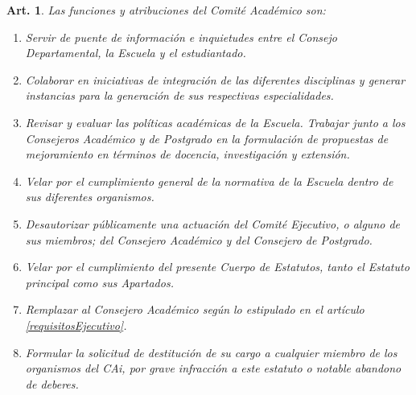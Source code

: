 \documentclass[letterpaper,11pt]{article}
\theoremstyle{plain}
\newtheorem{art}{Art.} %
\begin{document}
		\begin{art}\label{funcionesComiteAcademico}
			Las funciones y atribuciones del Comité Académico son:
			\begin{enumerate}
				\item Servir de puente de información e inquietudes entre el Consejo Departamental, la Escuela y el estudiantado.
				\item Colaborar en iniciativas de integración de las diferentes disciplinas y generar instancias para la generación de sus respectivas especialidades.
				\item Revisar y evaluar las políticas académicas de la Escuela. Trabajar junto a los Consejeros Académico y de Postgrado en la formulación de propuestas de mejoramiento en términos de docencia, investigación y extensión.
				\item Velar por el cumplimiento general de la normativa de la Escuela dentro de sus diferentes organismos.
				\item Desautorizar públicamente una actuación del Comité Ejecutivo, o alguno de sus miembros; del Consejero Académico y del Consejero de Postgrado.
				\item Velar por el cumplimiento del presente Cuerpo de Estatutos, tanto el Estatuto principal como sus Apartados.
				\item Remplazar al Consejero Académico según lo estipulado en el artículo \ref{requisitosEjecutivo}.
				\item Formular la solicitud de destitución de su cargo a cualquier miembro de los organismos del CAi, por grave infracción a este estatuto o notable abandono de deberes.
			\end{enumerate}
		\end{art}
\end{document}
